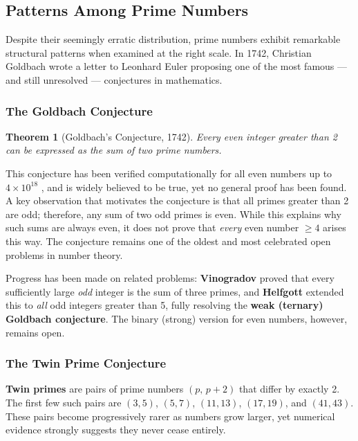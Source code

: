 \documentclass[11pt]{article}
\theoremstyle{plain}
\newtheorem{theorem}{Theorem}
\theoremstyle{definition}
\theoremstyle{remark}
\begin{document}
\subsection{Patterns Among Prime Numbers}

\par Despite their seemingly erratic distribution, prime numbers exhibit remarkable structural patterns when examined at the right scale. In 1742, Christian Goldbach wrote a letter to Leonhard Euler proposing one of the most famous — and still unresolved — conjectures in mathematics.

\subsubsection{The Goldbach Conjecture}

\begin{theorem}[Goldbach's Conjecture, 1742]
	\label{thm:gldthm}
	Every even integer greater than 2 can be expressed as the sum of two prime numbers.
\end{theorem}

\par This conjecture has been verified computationally for all even numbers up to $4 \times 10^{18}$ \cite{wiki_goldbach,aops_goldbach}, and is widely believed to be true, yet no general proof has been found. A key observation that motivates the conjecture is that all primes greater than 2 are odd; therefore, any sum of two odd primes is even. While this explains why such sums are always even, it does not prove that \textit{every} even number $\geq 4$ arises this way. The conjecture remains one of the oldest and most celebrated open problems in number theory.

\par Progress has been made on related problems: \textbf{Vinogradov} \cite{vinogradov_goldbach_1937} proved that every sufficiently large \textit{odd} integer is the sum of three primes, and \textbf{Helfgott} \cite{helfgott_goldbach_2013} extended this to \textit{all} odd integers greater than 5, fully resolving the \textbf{weak (ternary) Goldbach conjecture}. The binary (strong) version for even numbers, however, remains open.

\subsubsection{The Twin Prime Conjecture}

\par \textbf{Twin primes} \cite{wiki_twinprime} are pairs of prime numbers $(p,\, p+2)$ that differ by exactly 2. The first few such pairs are $(3, 5)$, $(5, 7)$, $(11, 13)$, $(17, 19)$, and $(41, 43)$. These pairs become progressively rarer as numbers grow larger, yet numerical evidence strongly suggests they never cease entirely.
\end{document}
